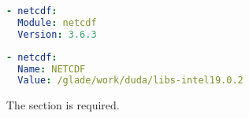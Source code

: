 \begin{lstlisting}[language=yaml, 
                   caption={Example Library Module},
                   label=lst:example_library_module]
- netcdf:
  Module: netcdf
  Version: 3.6.3
\end{lstlisting}

\begin{lstlisting}[language=yaml, 
                   caption={Example Library Environment Variable},
                   label=lst:example_library_env_var]
- netcdf:
  Name: NETCDF
  Value: /glade/work/duda/libs-intel19.0.2
\end{lstlisting}

The \libs section is required.
